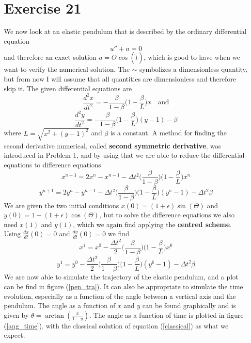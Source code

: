 \documentclass[norsk,a4paper,12pt]{article}
\begin{document}
\section*{Exercise 21}
We now look at an elastic pendulum that is described by the ordinary differential equation
\begin{equation}
u'' + u = 0
\label{classical}
\end{equation}
and therefore an exact solution $u=\Theta \cos(\tilde{t})$, which is good to have when we want to verify the numerical solution. The $\sim$ symbolizes a dimensionless quantity, but from now I will assume that all quantities are dimensionless and therefore skip it. The given differential equations are
\begin{equation}
\frac{d^2x}{dt^2}=-\frac{\beta}{1-\beta}\bigg(1-\frac{\beta}{L}\bigg)x\quad\text{and}
\end{equation}
\begin{equation}
\frac{d^2y}{dt^2}=-\frac{\beta}{1-\beta}\bigg(1-\frac{\beta}{L}\bigg)(y-1)-\beta
\end{equation}
where $L=\sqrt{x^2+(y-1)^2}$ and $\beta$ is a constant. A method for finding the second derivative numerical, called \textbf{second symmetric derivative}, was introduced in Problem 1, and by using that we are able to reduce the differential equations to difference equations
\begin{equation}
x^{n+1}=2x^n-x^{n-1}-\Delta t^2\bigg(\frac{\beta}{1-\beta}\bigg)\bigg(1-\frac{\beta}{L}\bigg)x^n
\end{equation}
\begin{equation}
y^{n+1}=2y^n-y^{n-1}-\Delta t^2\bigg(\frac{\beta}{1-\beta}\bigg)\bigg(1-\frac{\beta}{L}\bigg)(y^n-1)-\Delta t^2\beta
\end{equation}
We are given the two initial conditions $x(0)=(1+\epsilon)\sin(\Theta)$ and $y(0)=1-(1+\epsilon)\cos(\Theta)$, but to solve the difference equations we also need $x(1)$ and $y(1)$, which we again find applying the \textbf{centred scheme}. Using $\frac{dx}{dt}(0)=0$ and $\frac{dy}{dt}(0)=0$ we find
\begin{equation}
x^1=x^0-\frac{\Delta t^2}{2}\bigg(\frac{\beta}{1-\beta}\bigg)\bigg(1-\frac{\beta}{L}\bigg)x^0
\end{equation}
\begin{equation}
y^1=y^0-\frac{\Delta t^2}{2}\bigg(\frac{\beta}{1-\beta}\bigg)\bigg(1-\frac{\beta}{L}\bigg)(y^0-1)-\Delta t^2\beta
\end{equation}
We are now able to simulate the trajectory of the elastic pendulum, and a plot can be find in figure (\ref{pen_tra}). It can also be appropriate to simulate the time evolution, especially as a function of the angle between a vertical axis and the pendulum. The angle as a function of $x$ and $y$ can be found graphically and is given by $\theta=\arctan(\frac{x}{1-y})$. The angle as a function of time is plotted in figure (\ref{ang_time}), with the classical solution of equation (\ref{classical}) as what we expect.
\end{document}
